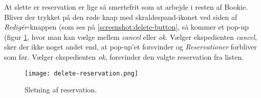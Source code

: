 At slette er reservation er lige så smertefrit som at arbejde i resten af Bookie. Bliver der trykket på den røde knap med skraldespand-ikonet ved siden af \textit{Redigér}-knappen (som ses på \ref{screenshot:delete-button}, så kommer et pop-up (figur \ref{screenshot:delete-reservation}, hvor man kan vælge mellem \textit{cancel} eller \textit{ok}. Vælger ekspedienten \textit{cancel}, sker der ikke noget andet end, at pop-up'et forsvinder og \textit{Reservationer} forbliver som før. Vælger ekspedienten \textit{ok}, forsvinder den valgte reservation fra listen.

\begin{figure} [h]
  \centering
  \texttt{[image: delete-reservation.png]}
  \caption{Sletning af reservation.}
  \label{screenshot:delete-reservation}
\end{figure}